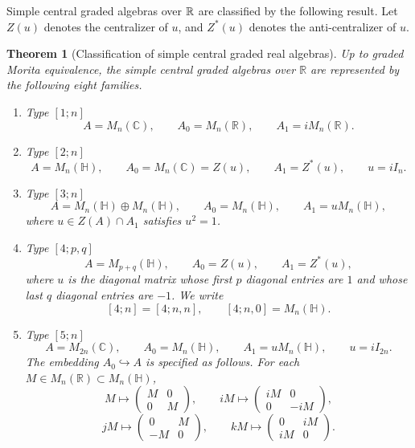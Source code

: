 \documentclass{amsart}
\numberwithin{equation}{section}
\theoremstyle{plain} %
\newtheorem{theorem}[equation]{Theorem}
\theoremstyle{definition}
\theoremstyle{remark}
\begin{document}
Simple central graded algebras over $\mathbb{R}$ are classified by the following result. Let $Z(u)$ denotes the centralizer of $u$, and $Z^*(u)$ denotes the anti-centralizer of $u$.
\begin{theorem}[Classification of simple central graded real algebras]
Up to graded Morita equivalence, the simple central graded algebras over $\mathbb R$ are represented by the following eight families. 
\begin{enumerate}
    \item Type $[1;n]$
    \[
        A=M_n(\mathbb C),
        \qquad
        A_0=M_n(\mathbb R),
        \qquad
        A_1=iM_n(\mathbb R).
    \]

        \item Type $[2;n]$
    \[
        A=M_n(\mathbb H),
        \qquad
        A_0=M_n(\mathbb C)=Z(u),
        \qquad
        A_1=Z^*(u),
        \qquad
        u=iI_n.
    \]

        \item Type $[3;n]$
    \[
        A=M_n(\mathbb H)\oplus M_n(\mathbb H),
        \qquad
        A_0=M_n(\mathbb H),
        \qquad
        A_1=uM_n(\mathbb H),
    \]
    where $u\in Z(A)\cap A_1$ satisfies $u^2=1$.

        \item Type $[4;p,q]$
    \[
        A=M_{p+q}(\mathbb H),
        \qquad
        A_0=Z(u),
        \qquad
        A_1=Z^*(u),
    \]
    where $u$ is the diagonal matrix whose first $p$ diagonal entries are $1$ and whose last $q$ diagonal entries are $-1$. We write
    \[
        [4;n]=[4;n,n],
        \qquad
        [4;n,0]=M_n(\mathbb H).
    \]

        \item Type $[5;n]$
    \[
        A=M_{2n}(\mathbb C),
        \qquad
        A_0=M_n(\mathbb H),
        \qquad
        A_1=uM_n(\mathbb H),
        \qquad
        u=iI_{2n}.
    \]
    The embedding $A_0\hookrightarrow A$ is specified as follows. For each $M\in M_n(\mathbb R)\subset M_n(\mathbb H)$,
    \[
        M\longmapsto
        \begin{pmatrix}
            M & 0\\
            0 & M
        \end{pmatrix},
        \qquad
        iM\longmapsto
        \begin{pmatrix}
            iM & 0\\
            0 & -iM
        \end{pmatrix},
    \]
    \[
        jM\longmapsto
        \begin{pmatrix}
            0 & M\\
            -M & 0
        \end{pmatrix},
        \qquad
        kM\longmapsto
        \begin{pmatrix}
            0 & iM\\
            iM & 0
        \end{pmatrix}.
    \]


\end{enumerate}
\end{theorem}
\end{document}
